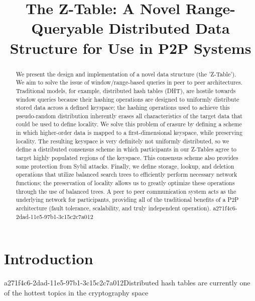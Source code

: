 \documentclass[12pt]{article}
\title{The Z-Table: A Novel Range-Queryable Distributed Data Structure for Use in P2P Systems}
\begin{document}
\maketitle

\begin{abstract}
We present the design and implementation of a novel data structure (the 'Z-Table'). We aim to solve the issue of window/range-based queries in peer to peer architectures. Traditional models, for example,  distributed hash tables (DHT), are hostile towards window queries because their hashing operations are designed to uniformly distribute stored data across a defined keyspace; the hashing operations used to achieve this pseudo-random distribution inherently erases all characteristics of the target data that could be used to define locality. We solve this problem of erasure by defining a scheme in which higher-order data is mapped to a first-dimensional keyspace, while preserving locality. The resulting keyspace is very definitely not uniformly distributed, so we define a distributed consensus scheme in which participants in our Z-Tables agree to target highly populated regions of the keyspace. This consensus scheme also provides some protection from Sybil attacks. Finally, we define storage, lookup, and deletion operations that utilize balanced search trees to efficiently perform necessary network functions; the preservation of locality allows us to greatly optimize these operations through the use of balanced trees. A peer to peer communication system acts as the underlying network for participants, providing all of the traditional benefits of a P2P architecture (fault tolerance, scalability, and truly independent operation).
a271f4c6-2dad-11e5-97b1-3c15c2c7a012\end{abstract}


\newpage
\section{Introduction}
a271f4c6-2dad-11e5-97b1-3c15c2c7a012Distributed hash tables are currently one of the hottest topics in the cryptography space~\cite{Stoica:2001dj,Rowstron:2001ea,Ratnasamy:2001wn}

\printbibliography
\end{document}
